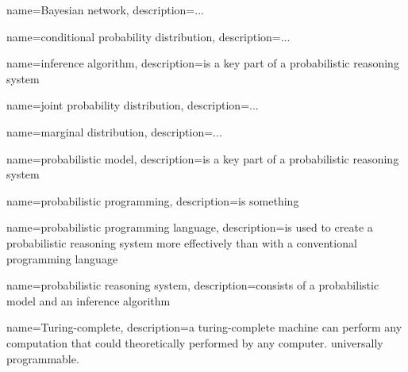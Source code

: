 {
  name=Bayesian network,
  description={...}
}

{
  name=conditional probability distribution,
  description={...}
}

{
  name=inference algorithm,
  description={is a key part of a \gls{probabilistic reasoning system}}
}

{
  name=joint probability distribution,
  description={...}
}

{
  name=marginal distribution,
  description={...}
}

{
  name=probabilistic model,
  description={is a key part of a \gls{probabilistic reasoning system}}
}

{
  name=probabilistic programming,
  description={is something}
}

{
  name=probabilistic programming language,
  description={is used to create a \gls{probabilistic reasoning system} more effectively than with a conventional programming language}
}

{
  name=probabilistic reasoning system,
  description={consists of a \gls{probabilistic model} and an \gls{inference algorithm}}
}

{
  name=Turing-complete,
  description={a turing-complete machine can perform any computation that could theoretically performed by any computer. universally programmable.}
}
